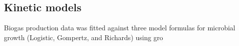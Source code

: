 \subsection{Kinetic models}
Biogas production data was fitted against three model formulas for microbial growth (Logistic, Gompertz, and Richards) using gro 